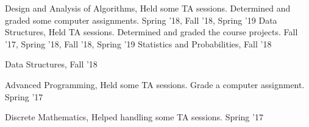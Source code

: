 



\begin{cvtas}

  \cvta
    {Design and Analysis of Algorithms, } %
    {Held some TA sessions. Determined and graded some computer assignments.} %
    {Spring '18, Fall '18, Spring '19} %
    {} %
  \cvta
    {Data Structures, } %
    {Held TA sessions. Determined and graded the course projects.} %
    {Fall '17, Spring '18, Fall '18, Spring '19} %
    {} %
  \cvta
    {Statistics and Probabilities, } %
    {} %
    {Fall '18} %
    {} %

  \cvta
    {Data Structures, } %
    {} %
    {Fall '18} %
    {} %

  \cvta
    {Advanced Programming, } %
    {Held some TA sessions. Grade a computer assignment.} %
    {Spring '17} %
    {} %

  \cvta
    {Discrete Mathematics, } %
    {Helped handling some TA sessions.} %
    {Spring '17} %
    {} %


\end{cvtas}

